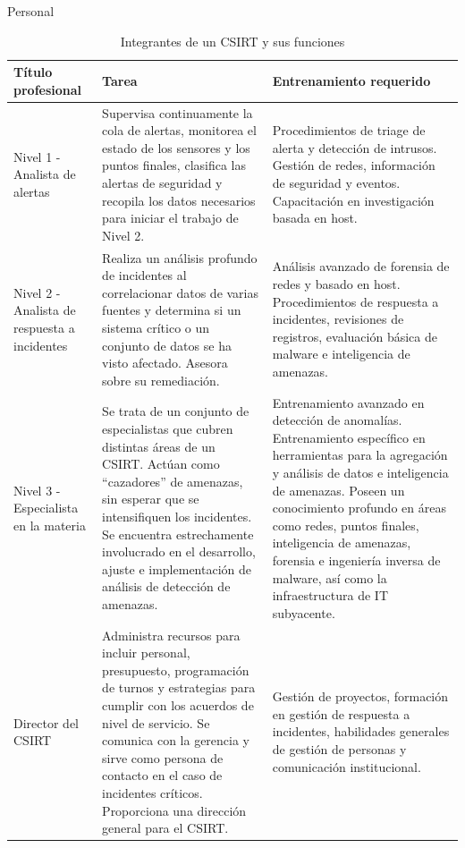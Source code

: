 \begin{section}{Personal}
    \begin{table}%
    \centering
        \begin{tabular}{ | m{10em} | m{16em}| m{11em} | } 
            \hline
            Título profesional & Tarea & Entrenamiento requerido \\ 
            \hline
            Nivel 1 - Analista de alertas & Supervisa continuamente la cola de alertas, monitorea el estado de los sensores y los puntos finales, clasifica las alertas de seguridad y recopila los datos necesarios para iniciar el trabajo de Nivel 2. & Procedimientos de triage de alerta y detección de intrusos. Gestión de redes, información de seguridad y eventos. Capacitación en investigación basada en host. \\ 
            \hline
            Nivel 2 - Analista de respuesta a incidentes & Realiza un análisis profundo de incidentes al correlacionar datos de varias fuentes y determina si un sistema crítico o un conjunto de datos se ha visto afectado. Asesora sobre su remediación. & Análisis avanzado de forensia de redes y basado en host. Procedimientos de respuesta a incidentes, revisiones de registros, evaluación básica de malware e inteligencia de amenazas. \\ 
            \hline
            Nivel 3 - Especialista en la materia & Se trata de un conjunto de especialistas que cubren distintas áreas de un CSIRT. 
            Actúan como “cazadores” de amenazas, sin esperar que se intensifiquen los incidentes. Se encuentra estrechamente involucrado en el desarrollo, ajuste e implementación de análisis de detección de amenazas.
             & Entrenamiento avanzado en detección de anomalías. Entrenamiento específico en herramientas para la agregación y análisis de datos e inteligencia de amenazas. 
            Poseen un conocimiento profundo en áreas como redes, puntos finales, inteligencia de amenazas, forensia e ingeniería inversa de malware, así como la infraestructura de IT subyacente.
            \\ 
             \hline
            Director del CSIRT & Administra recursos para incluir personal, presupuesto, programación de turnos y estrategias para cumplir con los acuerdos de nivel de servicio. Se comunica con la gerencia y sirve como persona de contacto en el caso de incidentes críticos. Proporciona una dirección general para el CSIRT. & Gestión de proyectos, formación en gestión de respuesta a incidentes, habilidades generales de gestión de personas y comunicación institucional.  \\
            \hline %
        \end{tabular}
        \caption{Integrantes de un CSIRT y sus funciones}
        \label{table:1}
    \end{table}
    
   \end{section}
   
